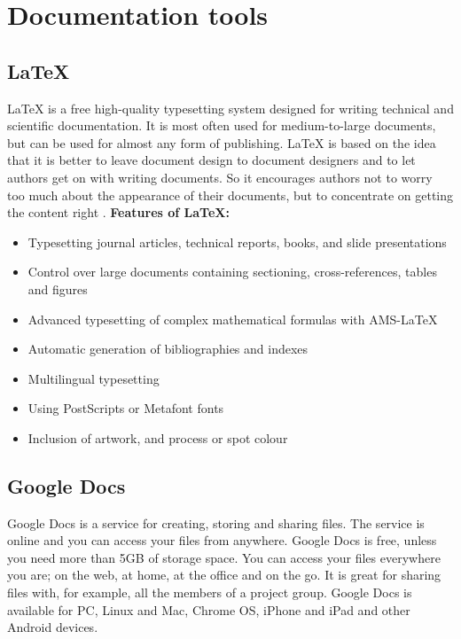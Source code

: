 \section{Documentation tools}

\subsection{LaTeX}
LaTeX is a free high-quality typesetting system designed for writing technical and scientific documentation. It is most often used for medium-to-large documents, but can be used for almost any form of publishing. 
\newline
\newline
LaTeX is based on the idea that it is better to leave document design to document designers and to let authors get on with writing documents. So it encourages authors not to worry too much about the appearance of their documents, but to concentrate on getting the content right \cite{bib:latex}.
\newline
\newline
\textbf{Features of LaTeX:}
\begin{itemize}
\item{}Typesetting journal articles, technical reports, books, and slide presentations
\item{}Control over large documents containing sectioning, cross-references, tables and figures
\item{}Advanced typesetting of complex mathematical formulas with AMS-LaTeX
\item{}Automatic generation of bibliographies and indexes
\item{}Multilingual typesetting
\item{}Using PostScripts or Metafont fonts
\item{}Inclusion of artwork, and process or spot colour
\end{itemize}

\subsection{Google Docs}
Google Docs is a service for creating, storing and sharing files. The service is online and you can access your files from anywhere. Google Docs is free, unless you need more than 5GB of storage space. You can access your files everywhere you are; on the web, at home, at the office and on the go. It is great for sharing files with, for example, all the members of a project group. Google Docs is available for PC, Linux and Mac, Chrome OS, iPhone and iPad and other Android devices.

